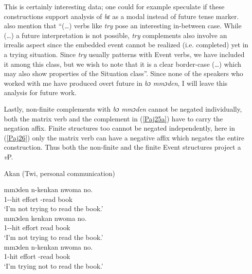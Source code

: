 \documentclass[output=paper]{langscibook}
\begin{document}
This is certainly interesting data; one could for example speculate if these constructions support \citet{owusu2014} analysis of \textit{bɛ} as a modal instead of future tense marker.\citet{wurmbrandlohninger2020} also mention that “(…) verbs like \emph{try} pose an interesting in-between case. While (…) a future interpretation is not possible, \emph{try} complements also involve an irrealis aspect since the embedded event cannot be realized (i.e. completed) yet in a trying situation. Since \emph{try} usually patterns with Event verbs, we have included it among this class, but we wish to note that it is a clear border-case (…) which may also show properties of the Situation class”. Since none of the speakers who worked with me have produced overt future in \emph{bɔ mmɔden}, I will leave this analysis for future work.

Lastly, non-finite complements with \emph{bɔ mmɔden} cannot be negated individually, both the matrix verb and the complement in (\ref{Paj25a}) have to carry the negation affix. Finite structures too cannot be negated independently, here in (\ref{Paj26}) only the matrix verb can have a negative affix which negates the entire construction. Thus both the non-finite and the finite Event structures project a \emph{v}P. 

\begin{exe}
\ex \label{Paj25} Akan (Twi, personal communication) 
\begin{xlist}

\ex \label{Paj25a} 
 {mmɔden} {n-kenkan} {nwoma} {no. }\\
   1{\sg}--hit effort -read book \\
\glt `I'm not trying to read the book.' \\

\ex \label{Paj25b} 
 {mmɔden} {kenkan} {nwoma} {no. }\\
   1{\sg}--hit effort read book \\
\glt `I'm not trying to read the book.' \\

\ex \label{Paj25c} 
 {mmɔden} {n-kenkan} {nwoma} {no. }\\
   1{\sg}-hit effort -read book \\
\glt `I'm trying not to read the book.' \\

\end{xlist}
\end{exe}
 \
\end{document}

